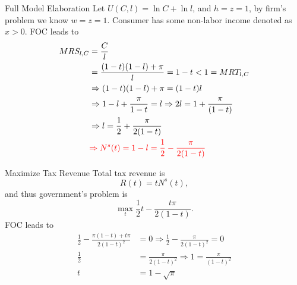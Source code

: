 \documentclass[11pt,aspectratio=43]{beamer}
\newcommand{\red}[1]{\textcolor{red}{#1}}
\theoremstyle{definition}
\begin{document}
\begin{frame}{Full Model Elaboration}
\label{slide:Full_Model_Elaboration}
    Let $ U( C, l ) = \ln C + \ln l $, and $ h = z = 1 $, by firm's problem we know $ w = z = 1 $.
    Consumer has some non-labor income denoted as $ x > 0 $. FOC leads to
    \begin{align*}
        MRS_{l, C}
            & = \frac{C}{l}
        \\
            & = \frac{( 1-t )( 1-l ) + \pi}{l} = 1 - t < 1 = MRT_{l, C}
        \\
            & \Rightarrow ( 1-t )( 1-l ) + \pi = ( 1-t )l
        \\
            & \Rightarrow 1-l + \frac{\pi}{1-t} = l \Rightarrow 2 l = 1 + \frac{\pi}{(1-t)}
        \\
            & \Rightarrow l = \frac{1}{2} + \frac{\pi}{2(1-t)}
        \\
            & \red{ \Rightarrow N^{s} ( t ) = 1-l = \frac{1}{2} - \frac{\pi}{2(1-t)} }
    \end{align*}
\end{frame}

\begin{frame}{Maximize Tax Revenue}
\label{slide:Maximize_Tax_Revenue}
    Total tax revenue is
    \begin{equation*}
       R( t ) = t N^{s}( t )
    ,\end{equation*}
    and thus government's problem is
    \begin{equation*}
       \max_{t} \frac{1}{2}t - \frac{t\pi}{2(1-t)}
    .\end{equation*}
    FOC leads to
    \begin{align*}
        \frac{1}{2} - \frac{\pi(1-t) + t\pi}{2(1-t)^{2}}
            & = 0 \Rightarrow \frac{1}{2} - \frac{\pi}{2(1-t)^{2}} = 0
        \\
        \frac{1}{2}
            & = \frac{\pi}{2(1-t)^{2}} \Rightarrow 1 = \frac{\pi}{(1-t)^{2}}
        \\
        t
            & = 1 - \sqrt{\pi}
    \end{align*}
\end{frame}
\end{document}
